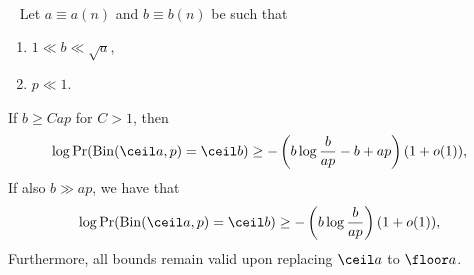 \begin{lemma}
\label{lemma:binom_lb}
%
~\\~
    Let \(a \equiv a(n)\) and \(b \equiv b(n)\) be such that
    \begin{enumerate}
        \item \(1 \ll b \ll \sqrt{a}\),
        \item \(p \ll 1\). 
    \end{enumerate}
    If \(b \geq C ap\) for \(C > 1\), then 
    \begin{equation}
    \label{eq:binom_lb_small_b}
        \log \Pr(\mathrm{Bin}(\ceil a, p) = \ceil b) \geq -\left(b \log \frac{b}{a p} - b + ap\right) (1 + o(1)),
    \end{equation}
    If also \(b \gg ap\), we have that 
    \begin{equation}
    \label{eq:binom_lb_large_b}
        \log \Pr(\mathrm{Bin}(\ceil a, p) = \ceil b) \geq -\left(b \log \frac{b}{a p}\right) (1 + o(1)),
    \end{equation}
Furthermore, all bounds remain valid upon replacing \(\ceil a\) to \(\floor a\).
\end{lemma}
